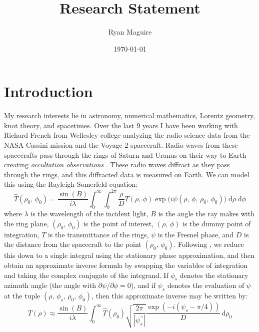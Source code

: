 \documentclass{article}
\title{Research Statement}
\author{Ryan Maguire}
\date{\today}
\begin{document}
    \maketitle
    \section{Introduction}
        My research interests lie in astronomy, numerical mathematics,
        Lorentz geometry, knot theory, and spacetimes.
        Over the last 9 years I have been working with Richard French from
        Wellesley college analyzing the radio science data from the NASA
        Cassini mission and the Voyage 2 spacecraft. Radio waves from these
        spacecrafts pass through the rings of Saturn and Uranus on their way
        to Earth creating \textit{occultation observations}
        \cite{Marouf1982TheoryOR}. These radio waves diffract as they pass
        through the rings, and this diffracted data is measured on Earth. We
        can model this using the Rayleigh-Somerfeld equation:
        \begin{equation}
            \hat{T}(\rho_{0},\,\phi_{0})
            =
            \frac{\sin(B)}{i\lambda}
            \int_{0}^{\infty}
                \int_{0}^{2\pi}
                    \frac{\rho}{D}
                    T(\rho,\,\phi)
                    \exp\big(i\psi(\rho,\,\phi,\,\rho_{0},\,\phi_{0})\big)\;
                \textrm{d}\rho\;
                \textrm{d}\phi
        \end{equation}
        where $\lambda$ is the wavelength of the incident light, $B$ is
        the angle the ray makes with the ring plane, $(\rho_{0},\,\phi_{0})$
        is the point of interest, $(\rho,\,\phi)$ is the dummy point of
        integration, $T$ is the transmittance of the rings, $\psi$ is
        the Fresnel phase, and $D$ is the distance from the spacecraft to
        the point $(\rho_{0},\,\phi_{0})$. Following \cite{MTR86}, we reduce
        this down to a single integral using the stationary phase approximation,
        and then obtain an approximate inverse formula by swapping the variables
        of integration and taking the complex conjugate of the integrand.
        If $\phi_{s}$ denotes the stationary azimuth angle
        (the angle with $\partial\psi/\partial\phi=0$), and if $\psi_{s}$
        denotes the evaluation of $\psi$ at the tuple
        $(\rho,\,\phi_{s},\,\rho_{0},\,\phi_{0})$, then this approximate inverse
        may be written by:
        \begin{equation}
            T(\rho)
            \approx
            \frac{\sin(B)}{i\lambda}
            \int_{0}^{\infty}
                \hat{T}(\rho_{0})
                \sqrt{\frac{2\pi}{|\psi_{s}^{\prime\prime}|}}
                \frac{\exp\left(-i(\psi_{s}-\pi/4)\right)}{D}\,
                    \textrm{d}\rho_{0}
        \end{equation}
\end{document}
